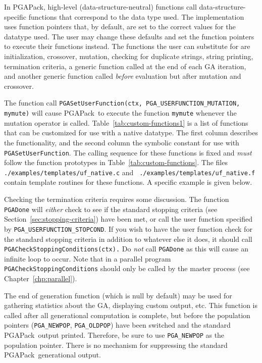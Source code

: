\documentclass{report}
\newcommand{\pga}{PGAPack}
\begin{document}
In \pga, high-level (data-structure-neutral) functions call
data-structure-specific functions that correspond to the data type used.  The
implementation uses function pointers that, by default, are set to the correct
values for the datatype used.  The user may change these defaults and set the
function pointers to execute their functions instead.  The functions the user
can substitute for are initialization, crossover, mutation, checking for
duplicate strings, string printing, termination criteria, a generic
function called at the end of each GA iteration, and another generic
function called \textit{before} evaluation but after mutation and
crossover.

The function call {\tt PGASetUserFunction(ctx, PGA\_USERFUNCTION\_MUTATION,
mymute)} will cause
\pga\ to execute the function {\tt mymute} whenever the mutation operator is
called.  Table~\ref{tab:custom-functions1} is a list of functions that can be
customized for use with a native datatype.  The first column describes the
functionality, and the second column the symbolic constant for use with {\tt
PGASetUserFunction}.  The calling sequence for these functions is fixed and
{\em must} follow the function prototypes in Table~\ref{tab:custom-functions}.
The files {\tt ./examples/templates/uf\_native.c} and {\tt
./examples/templates/uf\_native.f} contain template routines for these
functions.  A specific example is given below.

Checking the termination criteria requires some discussion.  The function {\tt
PGADone} will {\em either} check to see if the standard stopping criteria (see
Section~\ref{sec:stopping-criteria}) have been met, or call the user function
specified by {\tt PGA\_USERFUNCTION\_STOPCOND}.  If you wish to have the user
function check for the  standard stopping criteria  in addition to whatever
else it does, it should call {\tt PGACheckStoppingConditions(ctx).}
Do {\em not} call {\tt PGADone} as this will cause an infinite loop to occur.
Note that in a parallel program {\tt PGACheckStoppingConditions} should only
be called by the master process (see Chapter~\ref{chp:parallel}).

The end of generation function (which is null by default) may be used for
gathering statistics about the GA, displaying custom output, etc.  This
function is called after all generational computation is complete, but before
the population pointers ({\tt PGA\_NEWPOP}, {\tt PGA\_OLDPOP}) have been
switched and the standard \pga\ output printed.  Therefore, be sure to use
{\tt PGA\_NEWPOP} as the population pointer.  There is no mechanism for
suppressing the standard \pga\ generational output.
\end{document}
